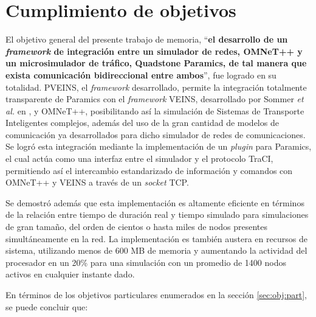 \section{Cumplimiento de objetivos}\label{sec:conclusiones:obj}

El objetivo general del presente trabajo de memoria, ``\textbf{el desarrollo de un \textit{framework} de integración entre un simulador de redes, OMNeT++ y un microsimulador de tráfico, Quadstone Paramics, de tal manera que exista comunicación bidireccional entre ambos}'', fue logrado en su totalidad. PVEINS, el \emph{framework} desarrollado, permite la integración totalmente transparente de Paramics con el \emph{framework} VEINS, desarrollado por Sommer \emph{et al.} en \autocite{sommer_german_dressler}, y OMNeT++, posibilitando así la simulación de Sistemas de Transporte Inteligentes complejos, además del uso de la gran cantidad de modelos de comunicación ya desarrollados para dicho simulador de redes de comunicaciones. 
Se logró esta integración mediante la implementación de un \emph{plugin} para Paramics, el cual actúa como una interfaz entre el simulador y el protocolo TraCI, permitiendo así el intercambio estandarizado de información y comandos con OMNeT++ y VEINS a través de un \emph{socket} TCP. 

Se demostró además que esta implementación es altamente eficiente en términos de la relación entre tiempo de duración real y tiempo simulado para simulaciones de gran tamaño, del orden de cientos o hasta miles de nodos presentes simultáneamente en la red. 
La implementación es también austera en recursos de sistema, utilizando menos de 600 MB de memoria y aumentando la actividad del procesador en un 20\% para una simulación con un promedio de 1400 nodos activos en cualquier instante dado.

En términos de los objetivos particulares enumerados en la sección \ref{sec:obj:part}, se puede concluir que:

